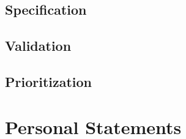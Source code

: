 \documentclass[10pt,a4paper]{article}
\begin{document}
\subsection{Specification}

\subsection{Validation}

\subsection{Prioritization}

\section{Personal Statements}
\end{document}

